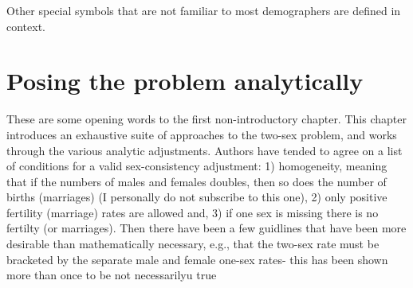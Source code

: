 \documentclass[reqno,12pt,oneside,a4paper]{report} %
\theoremstyle{plain}
\theoremstyle{definition}
\theoremstyle{remark}
\numberwithin{theorem}{chapter}     %
\begin{document}
Other special symbols that are not familiar to most demographers are defined in context.

 \chapter{Posing the problem analytically}
 \label{chap:Posing}
% 
These are some opening words to the first non-introductory chapter. This chapter introduces an exhaustive suite of
 approaches to the two-sex problem, and works through the various analytic adjustments. Authors have tended to agree on a list of conditions for a valid sex-consistency adjustment: 1) homogeneity, meaning that if the numbers of males and females doubles, then so does the number of births (marriages) (I personally do not subscribe to this one), 2) only positive fertility (marriage) rates are allowed and, 3) if one sex is missing there is no fertilty (or marriages). Then there have been a few guidlines that have been more desirable than mathematically necessary, e.g., that the two-sex rate must be bracketed by the separate male and female one-sex rates- this has been shown more than once to be not necessarilyu true \citep{yellin1977comparison}
\end{document}
